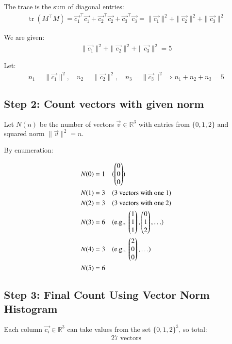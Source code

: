 \documentclass[journal]{IEEEtran}
\begin{document}
The trace is the sum of diagonal entries:
\begin{align}
\operatorname{tr}(M^\top M) = \vec{c_1}^\top \vec{c_1} + \vec{c_2}^\top \vec{c_2} + \vec{c_3}^\top \vec{c_3} = \|\vec{c_1}\|^2 + \|\vec{c_2}\|^2 + \|\vec{c_3}\|^2
\end{align}

We are given:
\begin{align}
\|\vec{c_1}\|^2 + \|\vec{c_2}\|^2 + \|\vec{c_3}\|^2 = 5
\end{align}

Let:
\begin{align}
n_1 = \|\vec{c_1}\|^2, \quad n_2 = \|\vec{c_2}\|^2, \quad n_3 = \|\vec{c_3}\|^2
\Rightarrow n_1 + n_2 + n_3 = 5
\end{align}

\subsection*{Step 2: Count vectors with given norm}

Let \( N(n) \) be the number of vectors \( \vec{v} \in \mathbb{R}^3 \) with entries from \(\{0,1,2\}\) and squared norm \( \|\vec{v}\|^2 = n \).

By enumeration:

\begin{align*}
N(0) &= 1 \quad (\begin{pmatrix}0\\0\\0\end{pmatrix}) \\
N(1) &= 3 \quad (\text{3 vectors with one }1) \\
N(2) &= 3 \quad (\text{3 vectors with one }2) \\
N(3) &= 6 \quad (\text{e.g., } \begin{pmatrix}1\\1\\1\end{pmatrix}, \begin{pmatrix}0\\1\\2\end{pmatrix}, \ldots) \\
N(4) &= 3 \quad (\text{e.g., } \begin{pmatrix}2\\0\\0\end{pmatrix}, \ldots) \\
N(5) &= 6
\end{align*}

\subsection*{Step 3: Final Count Using Vector Norm Histogram}

Each column \( \vec{c_i} \in \mathbb{R}^3 \) can take values from the set \( \{0,1,2\}^3 \), so total:
\begin{align}
27 \text{ vectors}
\end{align}
\end{document}
